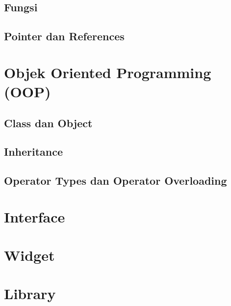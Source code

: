 \documentclass[11pt,b5paper,oneside,titlepage]{book}
\begin{document}
	\chapter{Fungsi}
	
	
	\chapter{Pointer dan References}\label{pointer-dan-references}
	
	\part{Objek Oriented Programming (OOP)}
	\chapter{Class dan Object}\label{class-dan-object}
	
	
	\chapter{Inheritance}\label{inheritance}
	
	
	\chapter{Operator Types dan Operator
		Overloading}\label{operator-types-dan-operator-overloading}
	
	
	\part{Interface}
	\part{Widget}
	\part{Library}
	
	\backmatter
	
	
	\printindex
\end{document}
